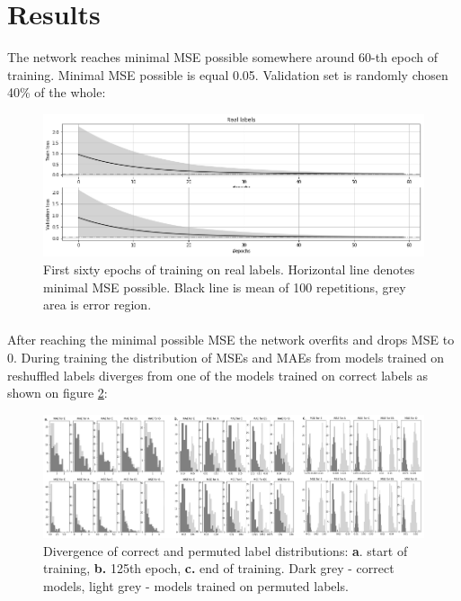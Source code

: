 \documentclass{llncs}
\begin{document}
\section{Results}\label{sec:Results}
The network reaches minimal MSE possible somewhere around 60-th epoch of training. Minimal MSE possible is equal 0.05. Validation set is randomly chosen 40\% of the whole: 
\begin{figure}[H]
	\centering
	\includegraphics[width=\textwidth]{figures/histories.png}
	\caption{First sixty epochs of training on real labels. Horizontal line denotes minimal MSE possible. Black line is mean of 100 repetitions, grey area is error region.}
	\label{fig:fig3}
\end{figure}

\paragraph{}
After reaching the minimal possible MSE the network overfits and drops MSE to 0. During training the distribution of MSEs and MAEs from models trained on reshuffled labels diverges from one of the models trained on correct labels as shown on figure \ref{fig:fig4}:

\begin{figure}[H]
	\centering
	\includegraphics[width=\textwidth]{figures/divergence.png}
	\caption{Divergence of correct and permuted label distributions: \textbf{a}. start of training, \textbf{b.} 125th epoch, \textbf{c.} end of training. Dark grey - correct models, light grey - models trained on permuted labels.}
	\label{fig:fig4}
\end{figure}
\end{document}
